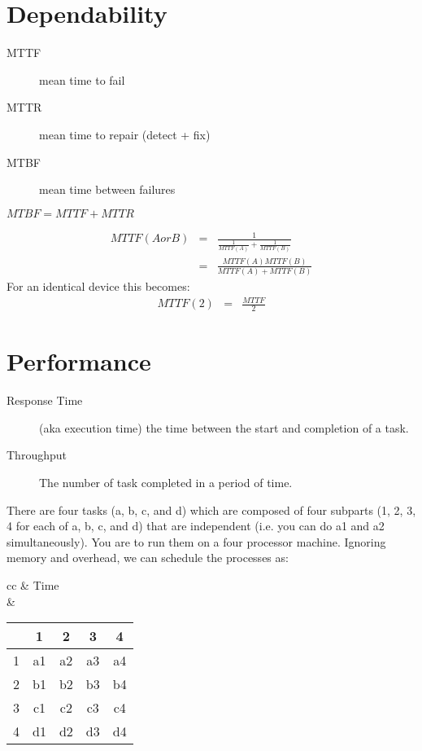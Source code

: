 \section{Dependability}

\begin{description}
  \item[MTTF] mean time to fail
  \item[MTTR] mean time to repair (detect + fix)
  \item[MTBF] mean time between failures
\end{description}

$MTBF=MTTF+MTTR$

\begin{eqnarray}
MTTF(A or B)&=& \frac{1}{\frac{1}{MTTF(A)} + \frac{1}{MTTF(B)}}\\
&=&\frac{MTTF(A)MTTF(B)}{MTTF(A)+MTTF(B)}
\end{eqnarray}
For an identical device this becomes:
\begin{eqnarray}
MTTF(2) &=& \frac{MTTF}{2}
\end{eqnarray}

\section{Performance}

\begin{description}
    \item[Response Time] (aka execution time) the time between the start and completion of a task.
    \item[Throughput] The number of task completed in a period of time.
\end{description}

There are four tasks (a, b, c, and d) which are composed of four subparts (1, 2, 3, 4 for each of a, b, c, and d) that are independent (i.e. you can do a1 and a2 simultaneously).  You are to run them on a four processor machine.  Ignoring memory and overhead, we can schedule the processes as:

\begin{tabular}{cc}
 & Time \\
  &
\begin{tabular}{c|cccc}
    & 1 & 2 & 3 & 4 \\
  \hline
  1 & a1 & a2 & a3 & a4 \\
  2 & b1 & b2 & b3 & b4 \\
  3 & c1 & c2 & c3 & c4 \\
  4 & d1 & d2 & d3 & d4 \\
\end{tabular}
\\
\end{tabular}

